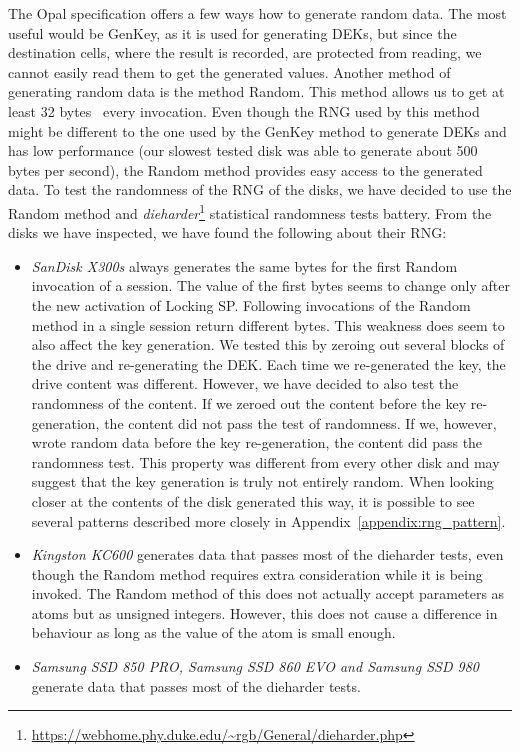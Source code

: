 \REPLACEME

The Opal specification offers a few ways how to generate random data. The most useful would be GenKey, as it is used for generating DEKs, but since the destination cells, where the result is recorded, are protected from reading, we cannot easily read them to get the generated values.
Another method of generating random data is the method Random. This method allows us to get at least 32 bytes~\cite{tcg-opal2} every invocation. Even though the RNG used by this method might be different to the one used by the GenKey method to generate DEKs and has low performance (our slowest tested disk was able to generate about 500 bytes per second), the Random method provides easy access to the generated data.
To test the randomness of the RNG of the disks, we have decided to use the Random method and \emph{dieharder}\footnote{\url{https://webhome.phy.duke.edu/~rgb/General/dieharder.php}} statistical randomness tests battery.
From the disks we have inspected, we have found the following about their RNG:
\begin{itemize}
    \item \emph{SanDisk X300s} always generates the same bytes for the first Random invocation of a session. The value of the first bytes seems to change only after the new activation of Locking SP. Following invocations of the Random method in a single session return different bytes. This weakness does seem to also affect the key generation. We tested this by zeroing out several blocks of the drive and re-generating the DEK. Each time we re-generated the key, the drive content was different. However, we have decided to also test the randomness of the content. If we zeroed out the content before the key re-generation, the content did not pass the test of randomness. If we, however, wrote random data before the key re-generation, the content did pass the randomness test. This property was different from every other disk and may suggest that the key generation is truly not entirely random. When looking closer at the contents of the disk generated this way, it is possible to see several patterns described more closely in Appendix~\ref{appendix:rng_pattern}.
    \item \emph{Kingston KC600} generates data that passes most of the dieharder tests, even though the Random method requires extra consideration while it is being invoked. The Random method of this does not actually accept parameters as atoms but as unsigned integers. However, this does not cause a difference in behaviour as long as the value of the atom is small enough. 
    \item \emph{Samsung SSD 850 PRO, Samsung SSD 860 EVO and Samsung SSD 980} generate data that passes most of the dieharder tests. %

\end{itemize}

